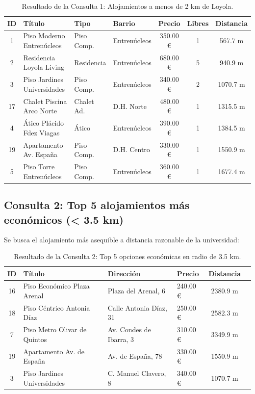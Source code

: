 \documentclass[a4paper,12pt]{article}
\begin{document}
\begin{table}[H]
  \centering
  \small
  \caption{Resultado de la Consulta 1: Alojamientos a menos de 2 km de Loyola.}
  \begin{tabular}{clllccc}
    \toprule
    \textbf{ID} & \textbf{Título} & \textbf{Tipo} & \textbf{Barrio} & \textbf{Precio} & \textbf{Libres} & \textbf{Distancia} \\
    \midrule
    1 & Piso Moderno Entrenúcleos & Piso Comp. & Entrenúcleos & 350.00 \euro{} & 1 & 567.7 m \\
    2 & Residencia Loyola Living & Residencia & Entrenúcleos & 680.00 \euro{} & 5 & 940.9 m \\
    3 & Piso Jardines Universidades & Piso Comp. & Entrenúcleos & 340.00 \euro{} & 2 & 1070.7 m \\
    17 & Chalet Piscina Arco Norte & Chalet Ad. & D.H. Norte & 480.00 \euro{} & 1 & 1315.5 m \\
    4 & Ático Plácido Fdez Viagas & Ático & Entrenúcleos & 390.00 \euro{} & 1 & 1384.5 m \\
    19 & Apartamento Av. España & Piso Comp. & D.H. Centro & 330.00 \euro{} & 1 & 1550.9 m \\
    5 & Piso Torre Entrenúcleos & Piso Comp. & Entrenúcleos & 360.00 \euro{} & 1 & 1677.4 m \\
    \bottomrule
  \end{tabular}
  \label{tab:consulta1}
\end{table}

\subsection{Consulta 2: Top 5 alojamientos más económicos (< 3.5 km)}
Se busca el alojamiento más asequible a distancia razonable de la universidad:
\begin{table}[H]
  \centering
  \small
  \caption{Resultado de la Consulta 2: Top 5 opciones económicas en radio de 3.5 km.}
  \begin{tabular}{clllcc}
    \toprule
    \textbf{ID} & \textbf{Título} & \textbf{Dirección} & \textbf{Precio} & \textbf{Distancia} \\
    \midrule
    16 & Piso Económico Plaza Arenal & Plaza del Arenal, 6 & 240.00 \euro{} & 2380.9 m \\
    18 & Piso Céntrico Antonia Díaz & Calle Antonia Díaz, 31 & 250.00 \euro{} & 2582.3 m \\
    7 & Piso Metro Olivar de Quintos & Av. Condes de Ibarra, 3 & 310.00 \euro{} & 3349.9 m \\
    19 & Apartamento Av. de España & Av. de España, 78 & 330.00 \euro{} & 1550.9 m \\
    3 & Piso Jardines Universidades & C. Manuel Clavero, 8 & 340.00 \euro{} & 1070.7 m \\
    \bottomrule
  \end{tabular}
  \label{tab:consulta2}
\end{table}
\end{document}
